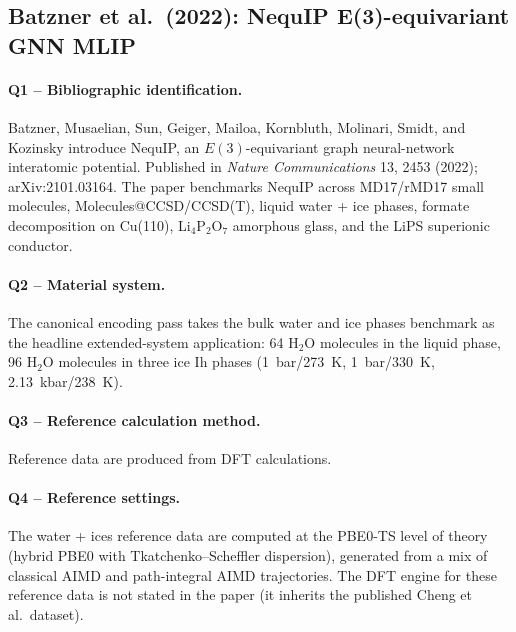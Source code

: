 \subsection{Batzner et al.\ (2022): NequIP E(3)-equivariant GNN MLIP}
\label{sec:appendix-example-batzner2022}

\paragraph{Q1 -- Bibliographic identification.}
Batzner, Musaelian, Sun, Geiger, Mailoa, Kornbluth, Molinari, Smidt,
and Kozinsky introduce NequIP, an $E(3)$-equivariant graph
neural-network interatomic potential. Published in
\emph{Nature Communications} 13, 2453 (2022); arXiv:2101.03164.
The paper benchmarks NequIP across MD17/rMD17 small molecules,
Molecules@CCSD/CCSD(T), liquid water + ice phases, formate
decomposition on Cu(110), Li$_4$P$_2$O$_7$ amorphous glass, and
the LiPS superionic conductor.


\paragraph{Q2 -- Material system.}
The canonical encoding pass takes the bulk water and ice phases
benchmark as the headline extended-system application: 64 H$_2$O
molecules in the liquid phase, 96 H$_2$O molecules in three ice Ih
phases (1~bar/273~K, 1~bar/330~K, 2.13~kbar/238~K).


\paragraph{Q3 -- Reference calculation method.}
Reference data are produced from DFT calculations.


\paragraph{Q4 -- Reference settings.}
The water + ices reference data are computed at the PBE0-TS level
of theory (hybrid PBE0 with Tkatchenko--Scheffler dispersion),
generated from a mix of classical AIMD and path-integral AIMD
trajectories. The DFT engine for these reference data is not stated
in the paper (it inherits the published Cheng et al.\ dataset).


